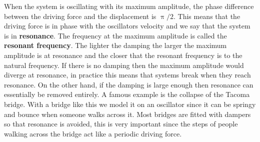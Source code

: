 When the system is oscillating with its maximum amplitude, the phase difference between the driving force and the displacement is $\uppi/2$. This means that the driving force is in phase with the oscillators velocity and we say that the system is in \textbf{resonance}. The frequency at the maximum amplitude is called the \textbf{resonant frequency}. The lighter the damping the larger the maximum amplitude is at resonance and the closer that the resonant frequency is to the natural frequency. If there is no damping then the maximum amplitude would diverge at resonance, in practice this means that systems break when they reach resonance. On the other hand, if the damping is large enough then resonance can essentially be removed entirely. A famous example is the collapse of the Tacoma bridge. With a bridge like this we model it on an oscillator since it can be springy and bounce when someone walks across it. Most bridges are fitted with dampers so that resonance is avoided, this is very important since the steps of people walking across the bridge act like a periodic driving force.
